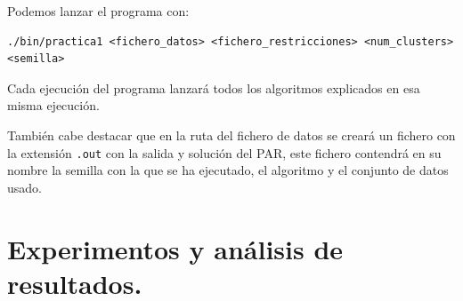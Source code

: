 \documentclass[12pt, spanish]{article}
\begin{document}
Podemos lanzar el programa con:

\begin{lstlisting}
./bin/practica1 <fichero_datos> <fichero_restricciones> <num_clusters> <semilla>
\end{lstlisting}

Cada ejecución del programa lanzará todos los algoritmos explicados en esa misma ejecución.

También cabe destacar que en la ruta del fichero de datos se creará un fichero con la extensión \texttt{.out} con la salida y solución del PAR, este fichero contendrá en su nombre la semilla con la que se ha ejecutado, el algoritmo y el conjunto de datos usado.













\section{Experimentos y análisis de resultados.}
\end{document}
